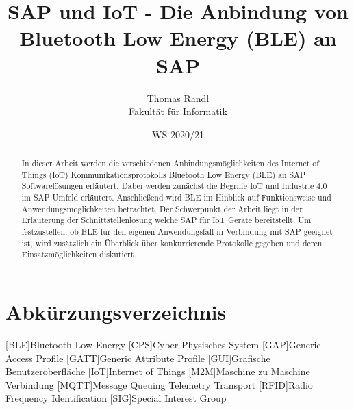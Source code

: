 \documentclass[twoside=false, %
    DIV=15
    ,%
    BCOR=15mm, %
    headinclude=true,
    footinclude=false,
    pagesize,%
    fontsize=12pt,%
    paper=a4,%
    numbers=noenddot
  ]{scrartcl}
\begin{document}
\def\figdir{figures}
\def\tabledir{tables}

\titlehead{
\raggedleft
\texttt{[image: \\figdir/logo-th-rosenheim-2019\_master\_quer\_2c.eps]}
}

\title{
\vspace*{0cm}
SAP und IoT - Die Anbindung von Bluetooth Low Energy (BLE) an SAP
}

\author{
Thomas Randl\\
Fakultät für Informatik}

\date{WS 2020/21}

\maketitle
\thispagestyle{empty}

\begin{abstract}
In dieser Arbeit werden die verschiedenen Anbindungsmöglichkeiten des Internet of Things (IoT) Kommunikationsprotokolls Bluetooth Low Energy (BLE) an SAP Softwarelösungen erläutert. Dabei werden zunächst die Begriffe IoT und Industrie 4.0 im SAP Umfeld erläutert. Anschließend wird BLE im Hinblick auf Funktionsweise und Anwendungsmöglichkeiten betrachtet.
Der Schwerpunkt der Arbeit liegt in der Erläuterung der Schnittstellenlösung welche SAP für IoT Geräte bereitstellt. Um festzustellen, ob BLE für den eigenen Anwendungsfall in Verbindung mit SAP geeignet ist, wird zusätzlich ein Überblick über konkurrierende Protokolle gegeben und deren Einsatzmöglichkeiten diskutiert.
\end{abstract}

\newpage

\tableofcontents


\newpage
{}
\listoffigures

\newpage
{}
\section*{Abkürzungsverzeichnis} %
\begin{acronym}[ECUAFFF]
	[BLE]{Bluetooth Low Energy}
	[CPS]{Cyber Physisches System}
	[GAP]{Generic Access Profile}
	[GATT]{Generic Attribute Profile}
	[GUI]{Grafische Benutzeroberfläche}
	[IoT]{Internet of Things}
	[M2M]{Maschine zu Maschine Verbindung}
	[MQTT]{Message Queuing Telemetry Transport}
	[RFID]{Radio Frequency Identification}
	[SIG]{Special Interest Group}
\end{acronym}


\newpage


\pagestyle{headings}



%
\setcounter{page}{4}


\end{document}
